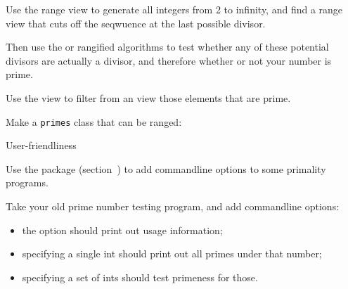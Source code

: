 \begin{exercise}
  Use the  range view to generate all integers from 2 to infinity,
  and find a range view that cuts off the seqwuence at the last possible divisor.

  Then use the  or  rangified algorithms to test
  whether any of these potential divisors are actually a divisor, and therefore
  whether or not your number is prime.
\end{exercise}

\begin{exercise}
  Use the  view to filter from
  an  view those elements that are prime.
\end{exercise}

\begin{exercise}
  \label{ex:primerange}
  Make a \lstinline{primes} class that can be ranged:
\end{exercise}

 {User-friendliness}

Use the  package (section~)
to add commandline options to some primality programs.

\begin{exercise}
  \label{ex:prime-opts}
  Take your old prime number testing program, and add commandline options:
  \begin{itemize}
  \item the  option should print out usage information;
  \item specifying a single int  should print out all
    primes under that number;
  \item specifying a set of ints  should test
    primeness for those.
  \end{itemize}
\end{exercise}

\endinput

